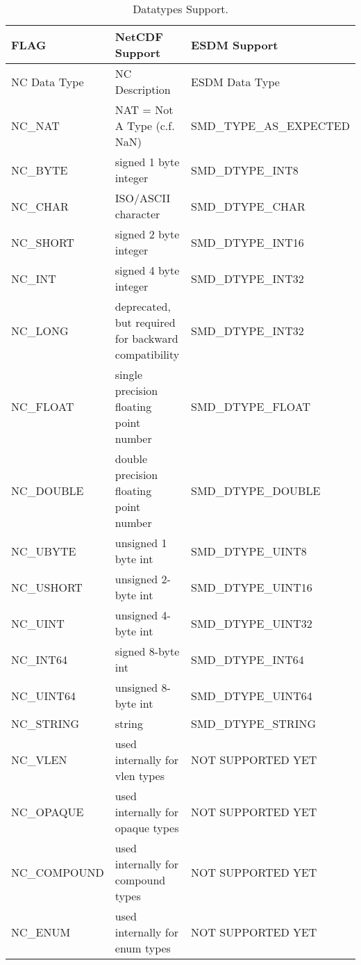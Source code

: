 \begin{table}[H]
\centering
\begin{tabular}{|l|m{6cm}|l|}
\hline
FLAG & NetCDF Support & ESDM Support \\ \hline \hline
NC Data Type  &  NC Description  & ESDM Data Type  \\ \hline
NC\_NAT & NAT = Not A Type (c.f. NaN) &    SMD\_TYPE\_AS\_EXPECTED        \\ \hline
NC\_BYTE & signed 1 byte integer &     SMD\_DTYPE\_INT8        \\ \hline
NC\_CHAR & ISO/ASCII character &      SMD\_DTYPE\_CHAR       \\ \hline
NC\_SHORT & signed 2 byte integer &   SMD\_DTYPE\_INT16          \\ \hline
NC\_INT & signed 4 byte integer &     SMD\_DTYPE\_INT32        \\ \hline
NC\_LONG & deprecated, but required for backward compatibility &    SMD\_DTYPE\_INT32         \\ \hline
NC\_FLOAT & single precision floating point number &   SMD\_DTYPE\_FLOAT           \\ \hline
NC\_DOUBLE & double precision floating point number &   SMD\_DTYPE\_DOUBLE          \\ \hline
NC\_UBYTE & unsigned 1 byte int &     SMD\_DTYPE\_UINT8        \\ \hline
NC\_USHORT & unsigned 2-byte int &    SMD\_DTYPE\_UINT16         \\ \hline
NC\_UINT & unsigned 4-byte int &   SMD\_DTYPE\_UINT32          \\ \hline
NC\_INT64 & signed 8-byte int &    SMD\_DTYPE\_INT64         \\ \hline
NC\_UINT64 & unsigned 8-byte int &    SMD\_DTYPE\_UINT64         \\ \hline
NC\_STRING & string &    SMD\_DTYPE\_STRING         \\ \hline
NC\_VLEN & used internally for vlen types &      NOT SUPPORTED YET       \\ \hline
NC\_OPAQUE & used internally for opaque types &     NOT SUPPORTED YET        \\ \hline
NC\_COMPOUND & used internally for compound types &    NOT SUPPORTED YET         \\ \hline
NC\_ENUM & used internally for enum types &       NOT SUPPORTED YET      \\ \hline \hline
\end{tabular}
\caption{Datatypes Support.}
\end{table}

